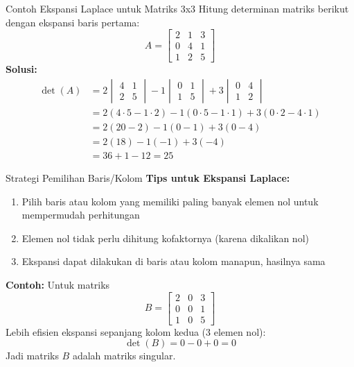 \documentclass{beamer}
\begin{document}
\begin{frame}[t,fragile]{Contoh Ekspansi Laplace untuk Matriks 3x3}
Hitung determinan matriks berikut dengan ekspansi baris pertama:
$$ A = \begin{bmatrix}
       	2 & 1 & 3 \\
	    0 & 4 & 1 \\
	    1 & 2 & 5
        \end{bmatrix} $$
\textbf{Solusi:}
\begin{align*}
\det(A) &= 2 \begin{vmatrix} 4 & 1 \\ 2 & 5 \end{vmatrix} - 1 \begin{vmatrix} 0 & 1 \\ 1 & 5 \end{vmatrix} + 3 \begin{vmatrix} 0 & 4 \\ 1 & 2 \end{vmatrix} \\
&= 2(4 \cdot 5 - 1 \cdot 2) - 1(0 \cdot 5 - 1 \cdot 1) + 3(0 \cdot 2 - 4 \cdot 1) \\
&= 2(20 - 2) - 1(0 - 1) + 3(0 - 4) \\
&= 2(18) - 1(-1) + 3(-4) \\
&= 36 + 1 - 12 = 25
\end{align*}
\end{frame}

\begin{frame}[t,fragile]{Strategi Pemilihan Baris/Kolom}
\textbf{Tips untuk Ekspansi Laplace:}
\begin{enumerate}
\item Pilih baris atau kolom yang memiliki paling banyak elemen nol untuk mempermudah perhitungan
\item Elemen nol tidak perlu dihitung kofaktornya (karena dikalikan nol)
\item Ekspansi dapat dilakukan di baris atau kolom manapun, hasilnya sama
\end{enumerate}
\vspace{0.3cm}
\textbf{Contoh:} Untuk matriks
$$ B = \begin{bmatrix}
       	2 & 0 & 3 \\
	    0 & 0 & 1 \\
	    1 & 0 & 5
        \end{bmatrix} $$
Lebih efisien ekspansi sepanjang kolom kedua (3 elemen nol):
$$ \det(B) = 0 - 0 + 0 = 0 $$
Jadi matriks $B$ adalah matriks singular.
\end{frame}
\end{document}
